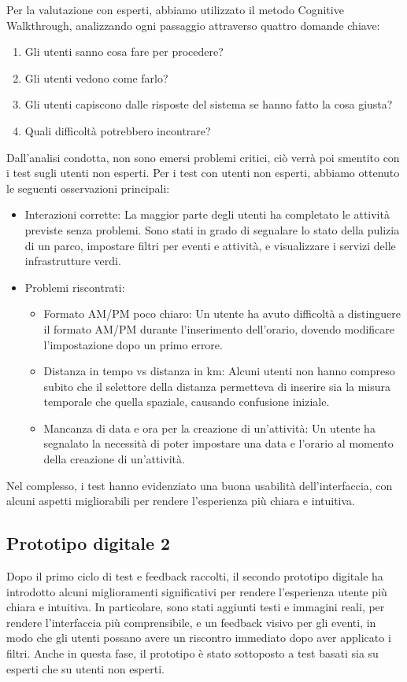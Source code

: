 Per la valutazione con esperti, abbiamo utilizzato il metodo Cognitive Walkthrough, analizzando ogni passaggio attraverso quattro domande chiave:
\begin{enumerate}
    \item Gli utenti sanno cosa fare per procedere?
    \item Gli utenti vedono come farlo?
    \item Gli utenti capiscono dalle risposte del sistema se hanno fatto la cosa giusta?
    \item Quali difficoltà potrebbero incontrare?
\end{enumerate}
Dall’analisi condotta, non sono emersi problemi critici, ciò verrà poi smentito con i test sugli utenti non esperti.
Per i test con utenti non esperti, abbiamo ottenuto le seguenti osservazioni principali:
\begin{itemize}
    \item Interazioni corrette: La maggior parte degli utenti ha completato le attività previste senza problemi. Sono stati in grado di segnalare lo stato della pulizia di un parco, impostare filtri per eventi e attività, e visualizzare i servizi delle infrastrutture verdi.
    \item Problemi riscontrati:
    \begin{itemize}
        \item Formato AM/PM poco chiaro: Un utente ha avuto difficoltà a distinguere il formato AM/PM durante l’inserimento dell’orario, dovendo modificare l’impostazione dopo un primo errore.
        \item Distanza in tempo vs distanza in km: Alcuni utenti non hanno compreso subito che il selettore della distanza permetteva di inserire sia la misura temporale che quella spaziale, causando confusione iniziale.
        \item Mancanza di data e ora per la creazione di un’attività: Un utente ha segnalato la necessità di poter impostare una data e l'orario al momento della creazione di un’attività.
    \end{itemize}
\end{itemize}
Nel complesso, i test hanno evidenziato una buona usabilità dell’interfaccia, con alcuni aspetti migliorabili per rendere l’esperienza più chiara e intuitiva.

\subsection{Prototipo digitale 2}
Dopo il primo ciclo di test e feedback raccolti, il secondo prototipo digitale ha introdotto alcuni miglioramenti significativi per rendere l’esperienza utente più chiara e intuitiva. In particolare, sono stati aggiunti testi e immagini reali, per rendere l’interfaccia più comprensibile, e un feedback visivo per gli eventi, in modo che gli utenti possano avere un riscontro immediato dopo aver applicato i filtri.
Anche in questa fase, il prototipo è stato sottoposto a test basati sia su esperti che su utenti non esperti.

